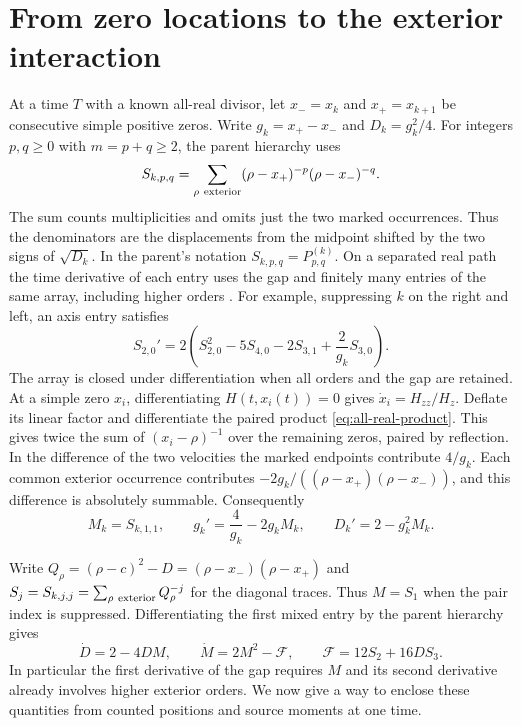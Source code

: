\section{From zero locations to the exterior interaction}\label{sec:exterior}

At a time \(T\) with a known all-real divisor, let \(x_-=x_k\) and
\(x_+=x_{k+1}\) be consecutive simple positive zeros. Write
\(g_k=x_+-x_-\) and \(D_k=g_k^2/4\). For integers \(p,q\ge0\) with
\(m=p+q\ge2\), the parent hierarchy uses
\[
 S_{k,p,q}=\sum_{\rho\ {\rm exterior}}
       (\rho-x_+)^{-p}(\rho-x_-)^{-q}.
\]
The sum counts multiplicities and omits just the two marked occurrences.
Thus the denominators are the displacements from the midpoint shifted by
the two signs of \(\sqrt{D_k}\). In the parent's notation
\(S_{k,p,q}=P^{(k)}_{p,q}\). On a separated real path the time derivative
of each entry uses the gap and finitely many entries of the same array,
including higher orders \cite[\S3, integer split recurrence]{AGC}.
For example, suppressing \(k\) on the right and left, an axis entry satisfies
\[
 S_{2,0}'=2\left(S_{2,0}^2-5S_{4,0}-2S_{3,1}+\frac{2}{g_k}S_{3,0}\right).
\]
The array is closed under differentiation when all orders and the gap are retained.
At a simple zero \(x_i\), differentiating \(H(t,x_i(t))=0\) gives
\(\dot x_i=H_{zz}/H_z\). Deflate its linear factor and differentiate
the paired product \eqref{eq:all-real-product}. This gives twice the
sum of \((x_i-\rho)^{-1}\) over the remaining zeros, paired by reflection.
In the difference of the two velocities the marked endpoints contribute
\(4/g_k\). Each common exterior occurrence contributes
\(-2g_k/((\rho-x_+)(\rho-x_-))\), and this difference is absolutely
summable. Consequently
\begin{equation}\label{eq:exterior-gap}
 M_k=S_{k,1,1},\qquad
 g_k'=\frac{4}{g_k}-2g_k M_k,\qquad D_k'=2-g_k^2M_k .
\end{equation}

Write \(Q_\rho=(\rho-c)^2-D=(\rho-x_-)(\rho-x_+)\) and
\(S_j=S_{k,j,j}=\sum_{\rho\ {\rm exterior}}Q_\rho^{-j}\) for the
diagonal traces. Thus \(M=S_1\) when the pair index is suppressed.
Differentiating the first mixed entry by the parent hierarchy
\cite[\S3, first diagonal row]{AGC} gives
\begin{equation}
 \dot D=2-4DM,\qquad
 \dot M=2M^2-\mathcal F,\qquad \mathcal F=12S_2+16D S_3 .
 \label{eq:parent}
\end{equation}
In particular the first derivative of the gap requires \(M\) and its
second derivative already involves higher exterior orders. We now give
a way to enclose these quantities from counted positions and source
moments at one time.

